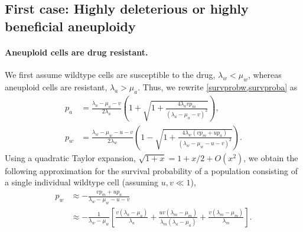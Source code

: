\documentclass[12pt]{extarticle}
\begin{document}

\subsection*{First case: Highly deleterious or highly beneficial aneuploidy}

\paragraph{Aneuploid cells are drug resistant.} 
We first assume wildtype cells are susceptible to the drug, $\lambda_w<\mu_w$, whereas aneuploid cells are resistant, $\lambda_a>\mu_a$.
Thus, we rewrite \cref{survprobw,survproba} as
\begin{align*}
p_a&=\frac{\lambda_a-\mu_a-v}{2\lambda_a}\left(1+\sqrt{1+\frac{4\lambda_avp_m}{\left(\lambda_a-\mu_a-v\right)^2}}\right),\\
p_w&=\frac{\lambda_w-\mu_w-u-v}{2\lambda_w}\left(1-\sqrt{1+\frac{4\lambda_w\left(vp_m+up_a\right)}{\left(\lambda_w-\mu_w-u-v\right)^2}}\right).
\end{align*}
Using a quadratic Taylor expansion, $\sqrt{1+x}=1+x/2+O(x^2)$, 
we obtain the following approximation for the survival probability of a population consisting of a single individual wildtype cell (assuming $u,v \ll 1$),
\begin{align}\label{survprobwinitial}
p_w 
&\approx -\frac{vp_m+up_a}{\lambda_w-\mu_w-u-v}\\
\nonumber
&\approx-\frac{1}{\lambda_w-\mu_w}\left[\frac{v\left(\lambda_a-\mu_a\right)}{\lambda_a}+\frac{uv\left(\lambda_m-\mu_m\right)}{\lambda_m\left(\lambda_a-\mu_a\right)}+\frac{v\left(\lambda_m-\mu_m\right)}{\lambda_m}\right].
\end{align}
\end{document}

